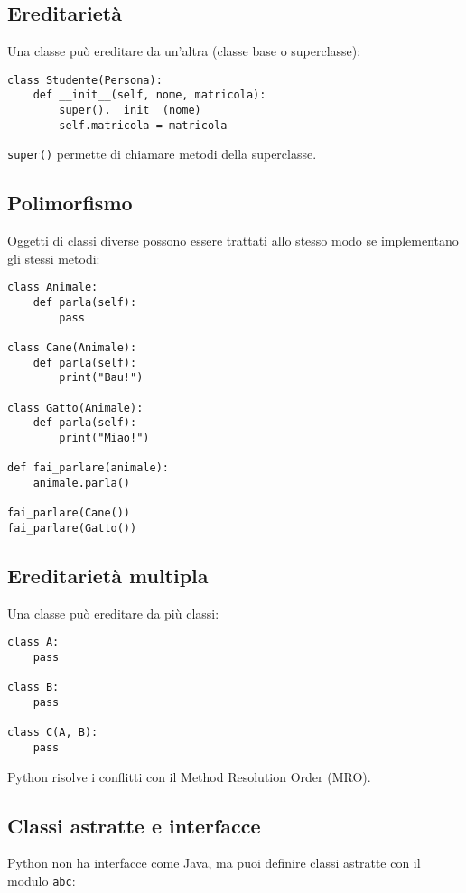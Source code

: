 \documentclass[a4paper,12pt]{article}
\begin{document}
\subsection*{Ereditarietà}
Una classe può ereditare da un'altra (classe base o superclasse):

\begin{lstlisting}
class Studente(Persona):
    def __init__(self, nome, matricola):
        super().__init__(nome)
        self.matricola = matricola
\end{lstlisting}

\texttt{super()} permette di chiamare metodi della superclasse.

\subsection*{Polimorfismo}
Oggetti di classi diverse possono essere trattati allo stesso modo se implementano gli stessi metodi:

\begin{lstlisting}
class Animale:
    def parla(self):
        pass

class Cane(Animale):
    def parla(self):
        print("Bau!")

class Gatto(Animale):
    def parla(self):
        print("Miao!")

def fai_parlare(animale):
    animale.parla()

fai_parlare(Cane())
fai_parlare(Gatto())
\end{lstlisting}

\subsection*{Ereditarietà multipla}
Una classe può ereditare da più classi:

\begin{lstlisting}
class A:
    pass

class B:
    pass

class C(A, B):
    pass
\end{lstlisting}

Python risolve i conflitti con il Method Resolution Order (MRO).

\subsection*{Classi astratte e interfacce}
Python non ha interfacce come Java, ma puoi definire classi astratte con il modulo \texttt{abc}:
\end{document}
